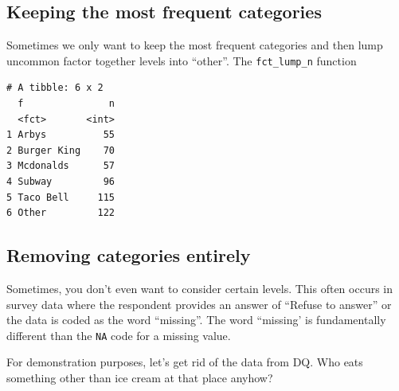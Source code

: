 \documentclass[
  letterpaper,
  DIV=11,
  numbers=noendperiod,
  oneside]{scrreprt}
\newenvironment{Shaded}{\begin{snugshade}}{\end{snugshade}}
\newcommand{\AttributeTok}[1]{\textcolor[rgb]{0.40,0.45,0.13}{#1}}
\newcommand{\ConstantTok}[1]{\textcolor[rgb]{0.56,0.35,0.01}{#1}}
\newcommand{\DecValTok}[1]{\textcolor[rgb]{0.68,0.00,0.00}{#1}}
\newcommand{\FunctionTok}[1]{\textcolor[rgb]{0.28,0.35,0.67}{#1}}
\newcommand{\NormalTok}[1]{\textcolor[rgb]{0.00,0.23,0.31}{#1}}
\newcommand{\OtherTok}[1]{\textcolor[rgb]{0.00,0.23,0.31}{#1}}
\newcommand{\SpecialCharTok}[1]{\textcolor[rgb]{0.37,0.37,0.37}{#1}}
\newcommand{\StringTok}[1]{\textcolor[rgb]{0.13,0.47,0.30}{#1}}
\begin{document}
\subsection{Keeping the most frequent
categories}\label{keeping-the-most-frequent-categories}

Sometimes we only want to keep the most frequent categories and then
lump uncommon factor together levels into ``other''. The
\texttt{fct\_lump\_n} function

\begin{Shaded}
\end{Shaded}

\begin{verbatim}
# A tibble: 6 x 2
  f               n
  <fct>       <int>
1 Arbys          55
2 Burger King    70
3 Mcdonalds      57
4 Subway         96
5 Taco Bell     115
6 Other         122
\end{verbatim}

\subsection{Removing categories
entirely}\label{removing-categories-entirely}

Sometimes, you don't even want to consider certain levels. This often
occurs in survey data where the respondent provides an answer of
``Refuse to answer'' or the data is coded as the word ``missing''. The
word ``missing' is fundamentally different than the \texttt{NA} code for
a missing value.

For demonstration purposes, let's get rid of the data from DQ. Who eats
something other than ice cream at that place anyhow?

\begin{Shaded}
\end{Shaded}
\end{document}
